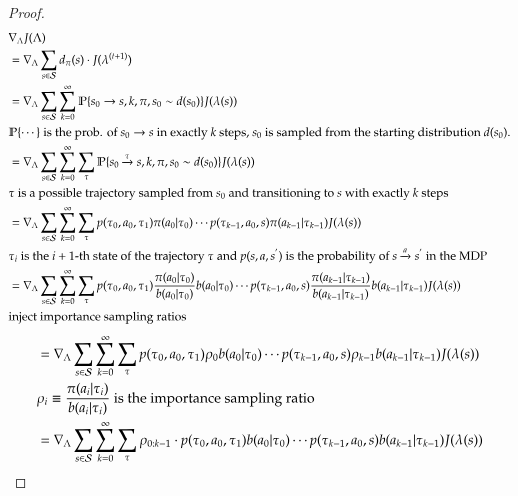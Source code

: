 \begin{proof}
\begin{equation}
\begin{aligned}
& \nabla_{\Lambda} J(\Lambda)\\
& = \nabla_{\Lambda} \sum_{s \in \mathcal{S}}{d_\pi(s) \cdot J(\lambda^{(t+1)})}\\
& = \nabla_{\Lambda} \sum_{s \in \mathcal{S}}{\sum_{k=0}^{\infty}{\mathbb{P}\{s_0 \to s, k, \pi, s_0 \sim d(s_0) \} J(\lambda(s))}}\\
& \text{$\mathbb{P}\{\cdots\}$ is the prob. of $s_0 \to s$ in exactly $k$ steps, $s_0$ is sampled from the starting distribution $d(s_0)$.}\\
& = \nabla_{\Lambda} \sum_{s \in \mathcal{S}}{\sum_{k=0}^{\infty}{\sum_{\tau}{\mathbb{P}\{s_0 \xrightarrow{\tau} s, k, \pi, s_0 \sim d(s_0) \} J(\lambda(s))}}}\\
& \text{$\tau$ is a possible trajectory sampled from $s_0$ and transitioning to $s$ with exactly $k$ steps}\\
& = \nabla_{\Lambda} \sum_{s \in \mathcal{S}}{\sum_{k=0}^{\infty}{\sum_{\tau}{p(\tau_0, a_0, \tau_1)\pi(a_0|\tau_0) \cdots p(\tau_{k-1}, a_0, s)\pi(a_{k-1}|\tau_{k-1}) J(\lambda(s))}}}\\
& \text{$\tau_i$ is the $i+1$-th state of the trajectory $\tau$ and $p(s, a, s^{'})$ is the probability of $s \xrightarrow{a} s^{'}$ in the MDP}\\
& = \nabla_{\Lambda} \sum_{s \in \mathcal{S}}{\sum_{k=0}^{\infty}{\sum_{\tau}{p(\tau_0, a_0, \tau_1)
\frac{\pi(a_0|\tau_0)}{b(a_0|\tau_0)}
b(a_0|\tau_0)
\cdots p(\tau_{k-1}, a_0, s)
\frac{\pi(a_{k-1}|\tau_{k-1})}{b(a_{k-1}|\tau_{k-1})}
b(a_{k-1}|\tau_{k-1}) J(\lambda(s))}}}\\
& \text{inject importance sampling ratios}\\
\end{aligned}\nonumber
\end{equation}
\begin{equation}
\begin{aligned}
& = \nabla_{\Lambda} \sum_{s \in \scriptS}{\sum_{k=0}^{\infty}{\sum_{\tau}{p(\tau_0, a_0, \tau_1) \rho_{0} b(a_0|\tau_0) \cdots p(\tau_{k-1}, a_0, s) \rho_{k-1} b(a_{k-1}|\tau_{k-1}) J(\lambda(s))}}}\\
& \text{$\rho_{i} \equiv \frac{\pi(a_i | \tau_i)}{b(a_i | \tau_i)}$ is the importance sampling ratio}\\
& = \nabla_{\Lambda} \sum_{s \in \scriptS}{\sum_{k=0}^{\infty}{\sum_{\tau}{\rho_{0:k-1} \cdot p(\tau_0, a_0, \tau_1)  b(a_0|\tau_0) \cdots p(\tau_{k-1}, a_0, s) b(a_{k-1}|\tau_{k-1}) J(\lambda(s))}}}\\

\end{aligned}
\end{equation}
\end{proof}
